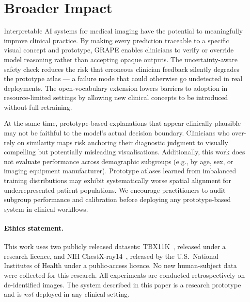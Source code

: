 \documentclass{article}
\begin{document}
\section*{Broader Impact}
\label{sec:impact}

Interpretable AI systems for medical imaging have the potential to meaningfully improve clinical practice.
By making every prediction traceable to a specific visual concept and prototype, GRAPE enables clinicians to verify or override model reasoning rather than accepting opaque outputs.
The uncertainty-aware safety check reduces the risk that erroneous clinician feedback silently degrades the prototype atlas — a failure mode that could otherwise go undetected in real deployments.
The open-vocabulary extension lowers barriers to adoption in resource-limited settings by allowing new clinical concepts to be introduced without full retraining.

At the same time, prototype-based explanations that appear clinically plausible may not be faithful to the model's actual decision boundary.
Clinicians who over-rely on similarity maps risk anchoring their diagnostic judgment to visually compelling but potentially misleading visualisations.
Additionally, this work does not evaluate performance across demographic subgroups (e.g., by age, sex, or imaging equipment manufacturer).
Prototype atlases learned from imbalanced training distributions may exhibit systematically worse spatial alignment for underrepresented patient populations.
We encourage practitioners to audit subgroup performance and calibration before deploying any prototype-based system in clinical workflows.

\paragraph{Ethics statement.}
This work uses two publicly released datasets: TBX11K~\cite{chen2020tbx11k}, released under a research licence, and NIH ChestX-ray14~\cite{wang2017chestxray14}, released by the U.S.\ National Institutes of Health under a public-access licence.
No new human-subject data were collected for this research.
All experiments are conducted retrospectively on de-identified images.
The system described in this paper is a research prototype and is \emph{not} deployed in any clinical setting.

\end{document}
